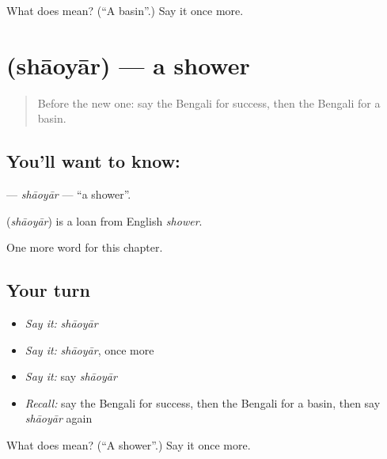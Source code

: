 \begin{tcolorbox}[breakable,colback=teal!4,colframe=teal!35!black,title={Before you move on}]
What does  mean? (\textquotedblleft{}A basin\textquotedblright{}.) Say it once more.
\end{tcolorbox}
\section[\texorpdfstring{\bn{শাওয়ার} (shāoyār)}{শাওয়ার (shāoyār)}]{ (shāoyār) — a shower}

\label{lesson:BN-C201-shaoyar}



\begin{quote}
Before the new one: say the Bengali for success, then the Bengali for a basin.
\end{quote}

\subsection*{You'll want to know: }
\textbf{} — \emph{shāoyār} — \textquotedblleft{}a shower\textquotedblright{}.

\begin{cousinweb}
\textbf{} (\emph{shāoyār}) is a loan from English \emph{shower}.
\end{cousinweb}

\begin{grammarlens}[title={What you've built}]
One more word for this chapter.
\end{grammarlens}

\subsection*{Your turn}
\begin{itemize}
\raggedright
  \item \emph{Say it:} \emph{shāoyār}
  \item \emph{Say it:} \emph{shāoyār}, once more
  \item \emph{Say it:} say \emph{shāoyār}
  \item \emph{Recall:} say the Bengali for success, then the Bengali for a basin, then say \emph{shāoyār} again
\end{itemize}

\begin{tcolorbox}[breakable,colback=teal!4,colframe=teal!35!black,title={Before you move on}]
What does  mean? (\textquotedblleft{}A shower\textquotedblright{}.) Say it once more.
\end{tcolorbox}
